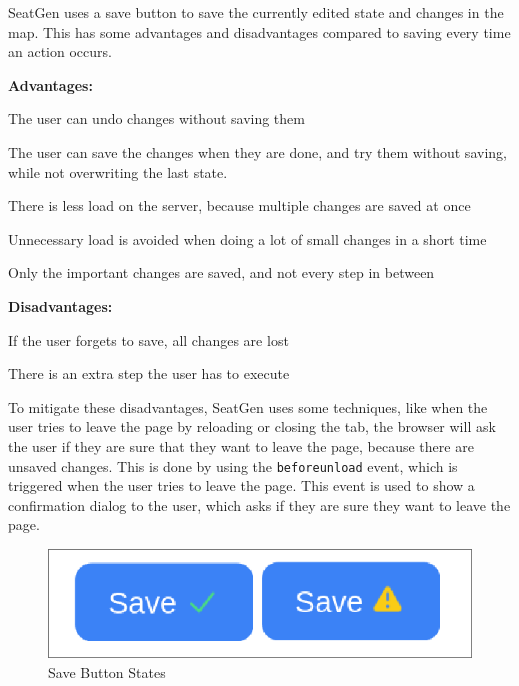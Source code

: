 SeatGen uses a save button to save the currently edited state and changes in the map. This has some advantages and disadvantages compared to saving every time an action occurs.

\newpage

\textbf{Advantages:}
\begin{compactitem}
    \item The user can undo changes without saving them
    \item The user can save the changes when they are done, and try them without saving, while not overwriting the last state.
    \item There is less load on the server, because multiple changes are saved at once
    \item Unnecessary load is avoided when doing a lot of small changes in a short time
    \item Only the important changes are saved, and not every step in between
\end{compactitem}

\textbf{Disadvantages:}
\begin{compactitem}
\item If the user forgets to save, all changes are lost
\item There is an extra step the user has to execute
\end{compactitem}

To mitigate these disadvantages, SeatGen uses some techniques, like when the user tries to leave the page by reloading or closing the tab, the browser will ask the user if they are sure that they want to leave the page, because there are unsaved changes. This is done by using the \texttt{beforeunload} event, which is triggered when the user tries to leave the page. This event is used to show a confirmation dialog to the user, which asks if they are sure they want to leave the page.

\begin{figure}[H]
    \centering
    \includegraphics[scale=0.4]{pics/save-button-states.png}
    \caption{Save Button States}
    \label{fig:save-button-states}
\end{figure}

